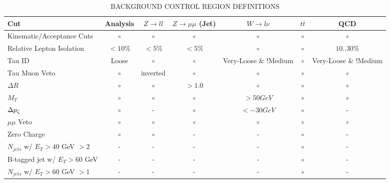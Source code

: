 \begin{sidewaystable}[!ht]
\begin{center}
\caption{BACKGROUND CONTROL REGION DEFINITIONS}
\label{tab:backgroundshapes}
\begin{small}
\begin{tabular}{lcccccc}
\toprule
Cut & Analysis & $Z \rightarrow ll$ & $Z \rightarrow \mu\mu$ (Jet)& $W \rightarrow l\nu$ & $t\overline{t}$ & QCD\\
\midrule 
Kinematic/Acceptance Cuts         & $\circ$  & $\circ$  & $\circ$ & $\circ$                & $\circ$ & $\circ$              \\
Relative Lepton Isolation         & $< 10\%$ & $< 5\%$  & $< 5\%$ & $\circ$                & $\circ$ & $10..30\%$           \\
Tau ID                            & Loose    & $\circ$  & $\circ$ & Very-Loose \& !Medium   & $\circ$ & Very-Loose \& !Medium \\
Tau Muon Veto	                  & $\circ$  & inverted & $\circ$ & $\circ$                & $\circ$ & $\circ$              \\
$\Delta R$                        & $\circ$  & $\circ$  & $> 1.0$ & $\circ$                & $\circ$ & $\circ$              \\
$M_{T}$                           & $\circ$  & $\circ$  & $\circ$ & $> 50 GeV$             & $\circ$ & $\circ$              \\
$\Delta p_{\zeta}$                      & $\circ$  & -        & $\circ$ & $< -30 GeV$            & $\circ$ & -                  \\
$\mu\mu$ Veto                     & $\circ$  & $\circ$  & $\circ$ & $\circ$                & $\circ$ & $\circ$              \\
Zero Charge                       & $\circ$  & $\circ$  & -       & -                      & $\circ$ & -                    \\
$N_{jets}$ w/ $E_{T}>40$ GeV $>2$ & -        & -        & -       & -                      & $\circ$ & -                    \\
B-tagged jet w/ $E_{T}>60$ GeV    & -        & -        & -       & -                      & $\circ$ & -                    \\
$N_{jets}$ w/ $E_{T}>60$ GeV $>1$ & -        & -        & -       & -                      & $\circ$ & -                    \\
\bottomrule
\end{tabular}
\end{small}
\end{center}
\end{sidewaystable}

